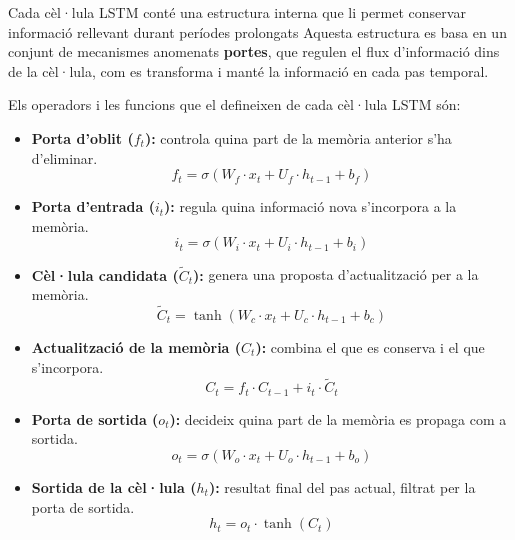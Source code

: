 \documentclass[../main.tex]{subfiles}
\begin{document}
Cada cèl·lula LSTM conté una estructura interna que li permet conservar informació rellevant durant períodes prolongats Aquesta estructura es basa en un conjunt de mecanismes anomenats \textbf{portes}, que regulen el flux d’informació dins de la cèl·lula, com es transforma i manté la informació en cada pas temporal. 

Els operadors i les funcions que el defineixen de cada cèl·lula LSTM són:


\begin{itemize}
    \item \textbf{Porta d’oblit ($f_t$):} controla quina part de la memòria anterior s’ha d’eliminar.
    \begin{equation}
        f_t = \sigma(W_f \cdot x_t + U_f \cdot h_{t-1} + b_f)
    \end{equation}

    \item \textbf{Porta d’entrada ($i_t$):} regula quina informació nova s’incorpora a la memòria.
    \begin{equation}
        i_t = \sigma(W_i \cdot x_t + U_i \cdot h_{t-1} + b_i)
    \end{equation}

    \item \textbf{Cèl·lula candidata ($\tilde{C}_t$):} genera una proposta d’actualització per a la memòria.
    \begin{equation}
        \tilde{C}_t = \tanh(W_c \cdot x_t + U_c \cdot h_{t-1} + b_c)
    \end{equation}

    \item \textbf{Actualització de la memòria ($C_t$):} combina el que es conserva i el que s’incorpora.
    \begin{equation}
        C_t = f_t \cdot C_{t-1} + i_t \cdot \tilde{C}_t
    \end{equation}

    \item \textbf{Porta de sortida ($o_t$):} decideix quina part de la memòria es propaga com a sortida.
    \begin{equation}
        o_t = \sigma(W_o \cdot x_t + U_o \cdot h_{t-1} + b_o)
    \end{equation}

    \item \textbf{Sortida de la cèl·lula ($h_t$):} resultat final del pas actual, filtrat per la porta de sortida.
    \begin{equation}
        h_t = o_t \cdot \tanh(C_t)
    \end{equation}
\end{itemize}
\end{document}

